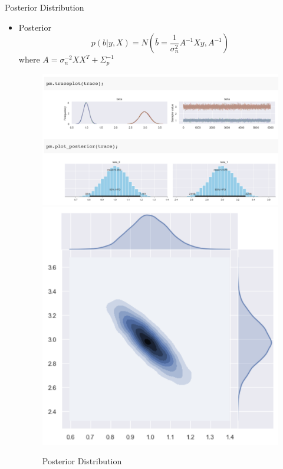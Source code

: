 \documentclass[10pt]{beamer}
\begin{document}
\begin{frame}{Posterior Distribution}
\begin{itemize}
\item Posterior 
$$
p(b|y, X) = N\left(\bar{b}=\frac{1}{\sigma_n^2}A^{-1}Xy, A^{-1}\right)
$$
where $A=\sigma_{n}^{-2}XX^T + \Sigma_p^{-1}$
\begin{center}
\begin{figure}
\includegraphics[scale=0.14]{images/lin_posterior_pymc3.png} 
\includegraphics[scale=0.14]{images/lin_join_posterior.png} 
\caption{Posterior Distribution}
\end{figure}
\end{center}
\end{itemize}
\end{frame}
\end{document}
